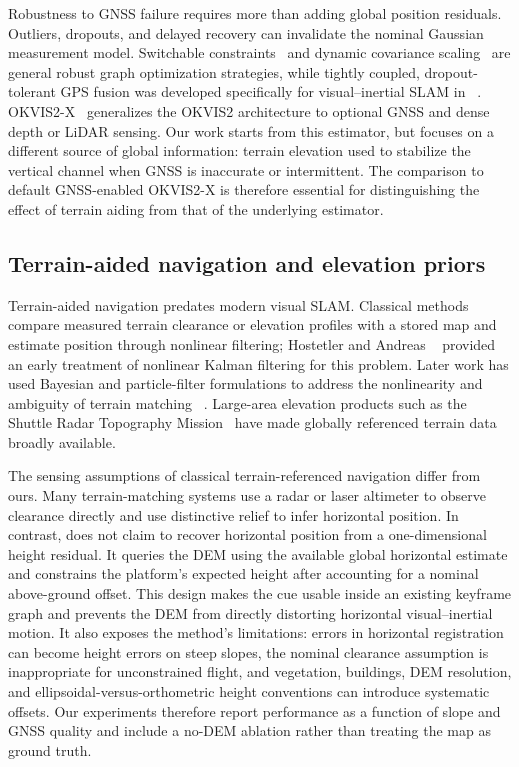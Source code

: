 Robustness to GNSS failure requires more than adding global position residuals.
Outliers, dropouts, and delayed recovery can invalidate the nominal Gaussian
measurement model. Switchable constraints~\cite{sunderhauf2012switchable} and
dynamic covariance scaling~\cite{agarwal2013dcs} are general robust graph
optimization strategies, while tightly coupled, dropout-tolerant GPS fusion was
developed specifically for visual--inertial SLAM in
~\cite{boche2022dropoutgps}. OKVIS2-X~\cite{boche2025okvis2x} generalizes the
OKVIS2 architecture to optional GNSS and dense depth or LiDAR sensing. Our work
starts from this estimator, but focuses on a different source of global
information: terrain elevation used to stabilize the vertical channel when
GNSS is inaccurate or intermittent. The comparison to default GNSS-enabled
OKVIS2-X is therefore essential for distinguishing the effect of terrain aiding
from that of the underlying estimator.

\subsection{Terrain-aided navigation and elevation priors}

Terrain-aided navigation predates modern visual SLAM. Classical methods compare
measured terrain clearance or elevation profiles with a stored map and estimate
position through nonlinear filtering; Hostetler and Andreas
~\cite{hostetler1983terrain} provided an early treatment of nonlinear Kalman
filtering for this problem. Later work has used Bayesian and particle-filter
formulations to address the nonlinearity and ambiguity of terrain matching
~\cite{bergman1999terrain}. Large-area elevation products such as the Shuttle
Radar Topography Mission~\cite{farr2007srtm} have made globally referenced
terrain data broadly available.

The sensing assumptions of classical terrain-referenced navigation differ from
ours. Many terrain-matching systems use a radar or laser altimeter to observe
clearance directly and use distinctive relief to infer horizontal position. In
contrast, \method{} does not claim to recover horizontal position from a
one-dimensional height residual. It queries the DEM using the available global
horizontal estimate and constrains the platform's expected height after
accounting for a nominal above-ground offset. This design makes the cue usable
inside an existing keyframe graph and prevents the DEM from directly distorting
horizontal visual--inertial motion. It also exposes the method's limitations:
errors in horizontal registration can become height errors on steep slopes,
the nominal clearance assumption is inappropriate for unconstrained flight,
and vegetation, buildings, DEM resolution, and ellipsoidal-versus-orthometric
height conventions can introduce systematic offsets. Our experiments therefore
report performance as a function of slope and GNSS quality and include a
no-DEM ablation rather than treating the map as ground truth.
